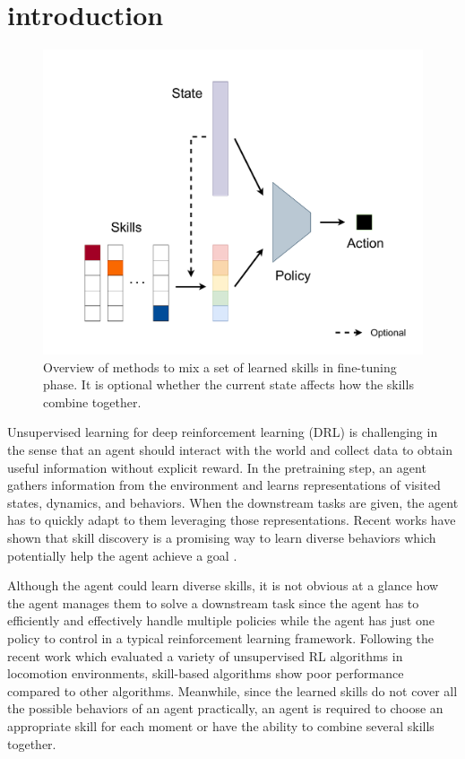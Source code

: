 \section{introduction}
\label{submission}

\begin{figure}[ht]
  \vskip 0.2in
  \begin{center}
  \centerline{\includegraphics[width=\columnwidth]{Figures/figure_diagram.pdf}}
  \caption{Overview of methods to mix a set of learned skills in fine-tuning phase. It is optional whether the current state affects how the skills combine together.}
  \label{overview}
  \end{center}
  \vskip -0.2in
\end{figure}

Unsupervised learning for deep reinforcement learning (DRL) is challenging in the sense that an agent should interact with the world and collect data to obtain useful information without explicit reward.
In the pretraining step, an agent gathers information from the environment and learns representations of visited states, dynamics, and behaviors.
When the downstream tasks are given, the agent has to quickly adapt to them leveraging those representations.
Recent works have shown that skill discovery is a promising way to learn diverse behaviors which potentially help the agent achieve a goal \cite{salge2014empowerment, gregor2016variational, eysenbach2018diversity}.

Although the agent could learn diverse skills, it is not obvious at a glance how the agent manages them to solve a downstream task since the agent has to efficiently and effectively handle multiple policies while the agent has just one policy to control in a typical reinforcement learning framework.
Following the recent work \cite{laskin2021urlb} which evaluated a variety of unsupervised RL algorithms in locomotion environments, skill-based algorithms show poor performance compared to other algorithms.
Meanwhile, since the learned skills do not cover all the possible behaviors of an agent practically, an agent is required to choose an appropriate skill for each moment or have the ability to combine several skills together.

